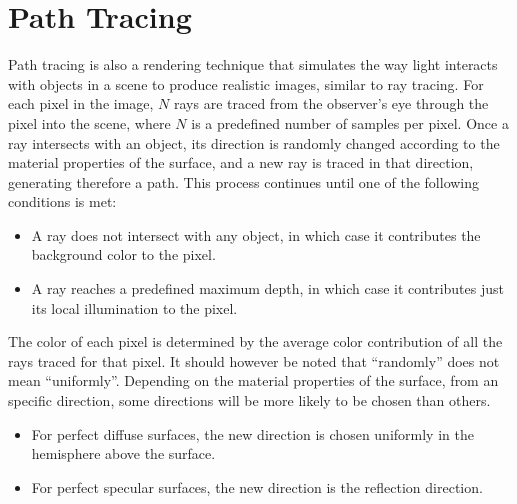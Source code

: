 \section{Path Tracing}

Path tracing is also a rendering technique that simulates the way light interacts with objects in a scene to produce realistic images, similar to ray tracing. For each pixel in the image, $N$ rays are traced from the observer's eye through the pixel into the scene, where $N$ is a predefined number of samples per pixel. Once a ray intersects with an object, its direction is randomly changed according to the material properties of the surface, and a new ray is traced in that direction, generating therefore a path. This process continues until one of the following conditions is met:
\begin{itemize}
    \item A ray does not intersect with any object, in which case it contributes the background color to the pixel.
    \item A ray reaches a predefined maximum depth, in which case it contributes just its local illumination to the pixel.
\end{itemize}

The color of each pixel is determined by the average color contribution of all the rays traced for that pixel. It should however be noted that ``randomly'' does not mean ``uniformly''. Depending on the material properties of the surface, from an specific direction, some directions will be more likely to be chosen than others.
\begin{itemize}
    \item For perfect diffuse surfaces, the new direction is chosen uniformly in the hemisphere above the surface.
    \item For perfect specular surfaces, the new direction is the reflection direction.
\end{itemize}